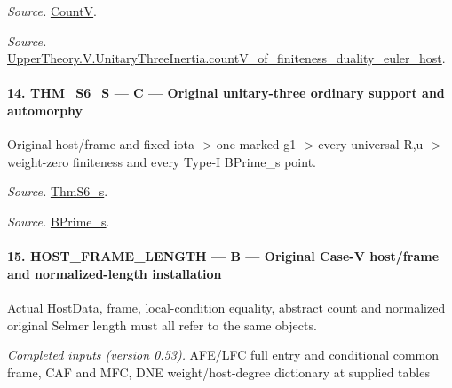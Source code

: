 \documentclass[11pt,a4paper]{article}
\numberwithin{equation}{section}
\theoremstyle{remark}\newtheorem{remark}[theorem]{Remark}
\begin{document}
\emph{Source.} \href{https://github.com/CocoSgt/riemann-hypothesis-lean/blob/7cbf7a0c32fca1badf05931879a37c3f8a2b03b4/src/Development/AutomorphicArithmetic/AutomorphicVarieties/HeightAndVanishing/Counts.lean#L69-L69}{CountV}.

\emph{Source.} \href{https://github.com/CocoSgt/riemann-hypothesis-lean/blob/7cbf7a0c32fca1badf05931879a37c3f8a2b03b4/src/Development/AutomorphicArithmetic/AutomorphicVarieties/ModularityArgument/ThresholdArguments/DenseThresholdCases/CountVOf.lean#L33-L60}{UpperTheory.V.UnitaryThreeInertia.countV\_\allowbreak of\_\allowbreak finiteness\_\allowbreak duality\_\allowbreak euler\_\allowbreak host}.



\paragraph{14. THM\_\allowbreak S6\_\allowbreak S — C — Original unitary-three ordinary support and automorphy}

Original host/frame and fixed iota -> one marked g1 -> every universal R,u -> weight-zero finiteness and every Type-I BPrime\_\allowbreak s point.

\emph{Source.} \href{https://github.com/CocoSgt/riemann-hypothesis-lean/blob/7cbf7a0c32fca1badf05931879a37c3f8a2b03b4/src/Development/AutomorphicArithmetic/AutomorphicVarieties/ModularityArgument/ThresholdArguments/DenseThresholdCases/ThmS6CoreS.lean#L17-L26}{ThmS6\_\allowbreak s}.

\emph{Source.} \href{https://github.com/CocoSgt/riemann-hypothesis-lean/blob/7cbf7a0c32fca1badf05931879a37c3f8a2b03b4/src/Development/AutomorphicArithmetic/AutomorphicVarieties/ModularityArgument/ThresholdArguments/DenseThresholdCases/ThmS6CoreS.lean#L12-L16}{BPrime\_\allowbreak s}.



\paragraph{15. HOST\_\allowbreak FRAME\_\allowbreak LENGTH — B — Original Case-V host/frame and normalized-length installation}

Actual HostData, frame, local-condition equality, abstract count and normalized original Selmer length must all refer to the same objects.

\emph{Completed inputs (version 0.53).} AFE/LFC full entry and conditional common frame, CAF and MFC, DNE weight/host-degree dictionary at supplied tables
\end{document}
